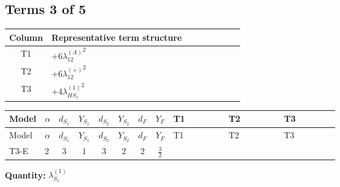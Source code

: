 \documentclass[8pt]{article}
\begin{document}
\begin{landscape}
\subsection*{Terms 3 of 5}
\begin{center}
\begin{tabular}{@{}c >{\raggedright\arraybackslash}p{0.82\linewidth}@{}}
\toprule
Column & Representative term structure \\
\midrule
T1 & \(\displaystyle +6 {\lambda_{12}^{(A)}}^2\) \\
\midrule
T2 & \(\displaystyle +6 {\lambda_{12}^{(\times)}}^2\) \\
\midrule
T3 & \(\displaystyle +4 {\lambda_{HS_1}^{(1)}}^2\) \\
\midrule
\bottomrule
\end{tabular}
\end{center}
\smallskip
\tiny
\begin{longtable}{@{}llcccccc >{\raggedright\arraybackslash}p{0.21\linewidth} >{\raggedright\arraybackslash}p{0.21\linewidth} >{\raggedright\arraybackslash}p{0.21\linewidth}@{}}
\toprule
Model & $\alpha$ & $d_{S_1}$ & $Y_{S_1}$ & $d_{S_2}$ & $Y_{S_2}$ & $d_F$ & $Y_F$ & T1 & T2 & T3 \\
\midrule
\endfirsthead
\toprule
Model & $\alpha$ & $d_{S_1}$ & $Y_{S_1}$ & $d_{S_2}$ & $Y_{S_2}$ & $d_F$ & $Y_F$ & T1 & T2 & T3 \\
\midrule
\endhead
T3-E & $2$ & $3$ & $1$ & $3$ & $2$ & $2$ & $\frac{3}{2}$ & \scriptsize\adjustbox{max width=\linewidth}{$\begin{gathered} +6 {\lambda_{12}^{(A)}}^2\end{gathered}$} & \scriptsize\adjustbox{max width=\linewidth}{$\begin{gathered} +6 {\lambda_{12}^{(\times)}}^2\end{gathered}$} & \scriptsize\adjustbox{max width=\linewidth}{$\begin{gathered} +4 {\lambda_{HS_1}^{(1)}}^2\end{gathered}$} \\
\midrule
\bottomrule
\end{longtable}
\clearpage
\noindent\textbf{Quantity: }$\lambda_{S_1}^{(1)}$\par\smallskip

\end{landscape}
\end{document}

